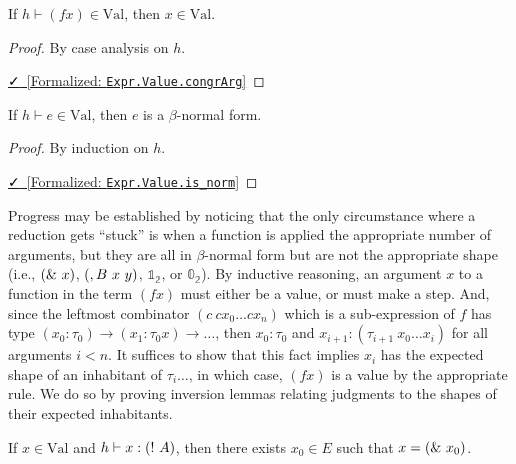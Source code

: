 \documentclass{lmcs}
\newcommand{\val}{\text{Val}}
\newcommand{\leanlink}[2]{
  \href{#1}{\textcolor{black}\faCheck~[Formalized: \texttt{#2}]}%
}
\begin{document}
\begin{lem}\label{lem:congrArgVal}
  If \(h \vdash (f x) \in \val\), then \(x \in \val\).
\end{lem}

\begin{proof}
  By case analysis on \(h\).

  \noindent \leanlink{https://github.com/lexzaiello/DCC/blob/fb7acf6d9644df7d13c809d12609b59eaca5c763/Dcc/Metatheory/Progress.lean\#L62}{Expr.Value.congrArg}
\end{proof}

\begin{lem}\label{lem:valnorm}
  If \(h \vdash e \in \val\), then \(e\) is a \(\beta\)-normal form.
\end{lem}

\begin{proof}
  By induction on \(h\).

  \noindent \leanlink{https://github.com/lexzaiello/DCC/blob/fb7acf6d9644df7d13c809d12609b59eaca5c763/Dcc/Metatheory/Progress.lean\#L72}{Expr.Value.is\_norm}
\end{proof}
Progress may be established by noticing that the only circumstance where a reduction gets ``stuck'' is when a function is applied the appropriate number of arguments, but they are all in \(\beta\)-normal form but are not the appropriate shape (i.e., \(\comb[\&][x]\), \(\comb[,B][x][y]\), \(\mathbb{1}_{\mathbb{2}}\), or \(\mathbb{0}_{\mathbb{2}}\)). By inductive reasoning, an argument \(x\) to a function in the term \((f x)\) must either be a value, or must make a step. And, since the leftmost combinator \((c\ cx_0 \ldots cx_n)\) which is a sub-expression of \(f\) has type \((x_0 : \tau_0) \rightarrow (x_1 : \tau_0 x) \rightarrow \ldots\), then \(x_0 : \tau_0\) and \(x_{i + 1} : (\tau_{i + 1}\ x_0 \ldots x_{i})\) for all arguments \(i < n\). It suffices to show that this fact implies \(x_i\) has the expected shape of an inhabitant of \(\tau_i \ldots\), in which case, \((f x)\) is a value by the appropriate rule. We do so by proving inversion lemmas relating judgments to the shapes of their expected inhabitants.

\begin{lem}\label{inv:box}
  If \(x \in \val\) and \(h \vdash x : \comb[!][A]\), then there exists \(x_0 \in E\) such that \(x = \comb[\&][x_0]\).
\end{lem}
\end{document}
